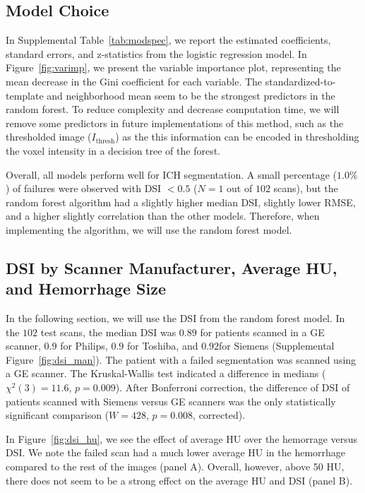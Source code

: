 \documentclass{elsarticle_nonatbib}\usepackage[]{graphicx}\usepackage[]{color}
\begin{document}
\subsection{Model Choice}
In Supplemental Table~\ref{tab:modspec}, we report the estimated coefficients, standard errors, and z-statistics from the logistic regression model.  In Figure~\ref{fig:varimp}, we present the variable importance plot, representing the mean decrease in the Gini coefficient for each variable.  The standardized-to-template and neighborhood mean seem to be the strongest predictors in the random forest.  To reduce complexity and decrease computation time, we will remove some predictors in future implementations of this method, such as the thresholded image ($I_{\text{thresh}}$) as the this information can be encoded in thresholding the voxel intensity in a decision tree of the forest.

Overall, all models perform well for ICH segmentation.  A small percentage ($1.0\%$) of failures were observed with DSI $< 0.5$ ($N = 1$ out of $102$ scans), but the random forest algorithm had a slightly higher median DSI, slightly lower RMSE, and a higher slightly correlation than the other models.  Therefore, when implementing the algorithm, we will use the random forest model.



\subsection{DSI by Scanner Manufacturer, Average HU, and Hemorrhage Size}
In the following section, we will use the DSI from the random forest model.  In the $102$ test scans, the median DSI was $0.89$ for patients scanned in a GE scanner, $0.9$ for Philips, $0.9$ for Toshiba, and $0.92$for Siemens (Supplemental Figure~\ref{fig:dsi_man}).  The patient with a failed segmentation was scanned using a GE scanner.  The Kruskal-Wallis test indicated a difference in medians ($\chi^2(3) = 11.6
$, $p = 0.009$).  After Bonferroni correction, the difference of DSI of patients scanned with Siemens versus GE scanners was the only statistically significant comparison ($W = 428
$, $p = 0.008$, corrected).

In Figure~\ref{fig:dsi_hu}, we see the effect of average HU over the hemorrage versus DSI.  We note the failed scan had a much lower average HU in the hemorrhage compared to the rest of the images (panel A).  Overall, however, above 50 HU, there does not seem to be a strong effect on the average HU and DSI (panel B).
\end{document}
